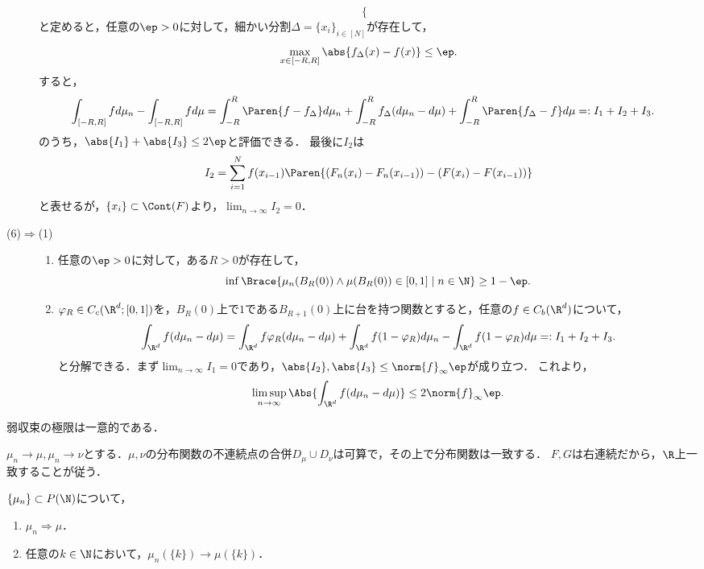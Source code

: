 \documentclass[uplatex,dvipdfmx]{jsreport}
\begin{document}
\begin{Proof}
\begin{description}
\[\begin{cases}
        \end{cases}\]
        と定めると，任意の$\ep>0$に対して，細かい分割$\Delta=\{x_i\}_{i\in[N]}$が存在して，
        \[\max_{x\in[-R,R]}\abs{f_\Delta(x)-f(x)}\le\ep.\]
        すると，
        \begin{align*}
            \int_{[-R,R]}fd\mu_n-\int_{[-R,R]}fd\mu&=\int^R_{-R}\Paren{f-f_\Delta}d\mu_n+\int^R_{-R}f_\Delta(d\mu_n-d\mu)+\int^R_{-R}\Paren{f_\Delta-f}d\mu
            =:I_1+I_2+I_3.
        \end{align*}
        のうち，$\abs{I_1}+\abs{I_3}\le2\ep$と評価できる．
        最後に$I_2$は
        \[I_2=\sum_{i=1}^Nf(x_{i-1})\Paren{(F_n(x_i)-F_n(x_{i-1}))-(F(x_i)-F(x_{i-1}))}\]
        と表せるが，$\{x_i\}\subset\Cont(F)$より，$\lim_{n\to\infty}I_2=0$．
        \item[(6)$\Rightarrow$(1)] \begin{enumerate}[{Step}1]
            \item 任意の$\ep>0$に対して，ある$R>0$が存在して，
            \[\inf\Brace{\mu_n(B_R(0))\land\mu(B_R(0))\in[0,1]\mid n\in\N}\ge1-\ep.\]
            \item $\varphi_R\in C_c(\R^d;[0,1])$を，$B_R(0)$上で$1$である$B_{R+1}(0)$上に台を持つ関数とすると，任意の$f\in C_b(\R^d)$について，
            \[\int_{\R^d}f(d\mu_n-d\mu)=\int_{\R^d}f\varphi_R(d\mu_n-d\mu)+\int_{\R^d}f(1-\varphi_R)d\mu_n-\int_{\R^d}f(1-\varphi_R)d\mu=:I_1+I_2+I_3.\]
            と分解できる．まず$\lim_{n\to\infty}I_1=0$であり，$\abs{I_2},\abs{I_3}\le\norm{f}_\infty\ep$が成り立つ．
            これより，
            \[\limsup_{n\to\infty}\Abs{\int_{\R^d}f(d\mu_n-d\mu)}\le2\norm{f}_\infty\ep.\]
        \end{enumerate}
    \end{description}
\end{Proof}

\begin{corollary}[弱収束極限の一意性]
    弱収束の極限は一意的である．
\end{corollary}
\begin{Proof}
    $\mu_n\to\mu,\mu_n\to\nu$とする．$\mu,\nu$の分布関数の不連続点の合併$D_\mu\cup D_\nu$は可算で，その上で分布関数は一致する．
    $F,G$は右連続だから，$\R$上一致することが従う．
\end{Proof}

\begin{corollary}[離散分布の弱収束の特徴付け]
    $\{\mu_n\}\subset P(\N)$について，
    \begin{enumerate}
        \item $\mu_n\Rightarrow\mu$．
        \item 任意の$k\in\N$において，$\mu_n(\{k\})\to\mu(\{k\})$．
    \end{enumerate}
\end{corollary}
\end{document}
